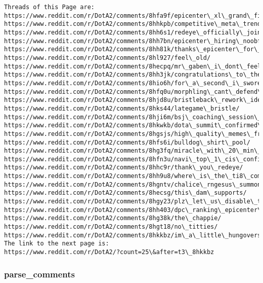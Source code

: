 \documentclass[11pt]{article}
\begin{document}
    \begin{Verbatim}[commandchars=\\\{\}]
Threads of this Page are:
https://www.reddit.com/r/DotA2/comments/8hfa9f/epicenter\_xl\_grand\_finals/
https://www.reddit.com/r/DotA2/comments/8hhkpb/competitive\_meta\_trends\_epicenter\_xl/
https://www.reddit.com/r/DotA2/comments/8hh6s1/redeye\_officially\_joins\_the\_reddit\_community/
https://www.reddit.com/r/DotA2/comments/8hh7bn/epicenter\_hiring\_noobfromua\_was\_a\_godsend/
https://www.reddit.com/r/DotA2/comments/8hh81k/thanks\_epicenter\_for\_the\_fantastic\_major/
https://www.reddit.com/r/DotA2/comments/8hl927/feel\_old/
https://www.reddit.com/r/DotA2/comments/8hecpq/mr\_gaben\_i\_dont\_feel\_2gd/
https://www.reddit.com/r/DotA2/comments/8hh3jk/congratulations\_to\_the\_winners\_of\_epicenter\_xl/
https://www.reddit.com/r/DotA2/comments/8hio6h/for\_a\_second\_i\_swore\_batrider\_had\_a\_bubble\_butt/
https://www.reddit.com/r/DotA2/comments/8hfq0u/morphling\_cant\_defend\_this/
https://www.reddit.com/r/DotA2/comments/8hjd8u/bristleback\_rework\_ideas/
https://www.reddit.com/r/DotA2/comments/8hks44/lategame\_bristle/
https://www.reddit.com/r/DotA2/comments/8hji6m/bsj\_coaching\_session\_went\_wrong/
https://www.reddit.com/r/DotA2/comments/8hkwkb/dota\_summit\_confirmed\_july\_2018/
https://www.reddit.com/r/DotA2/comments/8hgsjs/high\_quality\_memes\_from\_the\_crowd/
https://www.reddit.com/r/DotA2/comments/8hfs6i/bulldog\_shirt\_pool/
https://www.reddit.com/r/DotA2/comments/8hg3fq/miracle\_with\_20\_min\_rampage/
https://www.reddit.com/r/DotA2/comments/8hfn3u/navi\_top\_1\_cis\_confirmed/
https://www.reddit.com/r/DotA2/comments/8hhc9r/thank\_you\_redeye/
https://www.reddit.com/r/DotA2/comments/8hh9u8/where\_is\_the\_ti8\_compendium/
https://www.reddit.com/r/DotA2/comments/8hgntv/chalice\_rngesus\_summon/
https://www.reddit.com/r/DotA2/comments/8hecsg/this\_dam\_supports/
https://www.reddit.com/r/DotA2/comments/8hgy23/plz\_let\_us\_disable\_the\_autocast\_on\_phantom/
https://www.reddit.com/r/DotA2/comments/8hh403/dpc\_ranking\_epicenter\_xl\_5th\_may\_2018/
https://www.reddit.com/r/DotA2/comments/8hg38k/the\_chappie/
https://www.reddit.com/r/DotA2/comments/8hgt18/no\_titties/
https://www.reddit.com/r/DotA2/comments/8hkkbz/im\_a\_little\_hungoverso\_i\_painted\_dark\_seer/
The link to the next page is:
https://www.reddit.com/r/DotA2/?count=25\&after=t3\_8hkkbz

    \end{Verbatim}

    \subsubsection{parse\_comments}\label{parse_comments}
\end{document}
